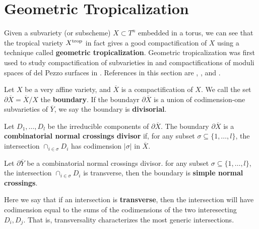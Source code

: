 \section{Geometric Tropicalization}
\label{sec:geometric-tropicalization}
    Given a subvariety (or subscheme) $X \subset T^n$ embedded in a torus,
    we can see that the tropical variety $X^{\operatorname{trop}}$ in fact gives a good compactification of $X$
    using a technique called \textbf{geometric tropicalization}.
    Geometric tropicalization was first used to study compactification of subvarieties in \citet{Tevelev2007} and compactifications of moduli spaces of del Pezzo surfaces in \citet{Hacking2007}. References in this section are 
    \citet{Maclagan2015}, \citet{Payne2014},
    \citet{Cavalieri2014}
    and 
    \citet{Cueto2011}.
    
    \begin{definition}
    \label{def:boundary-divisorial}
        Let $X$ be a very affine variety,
        and $\overline{X}$ is a compactification of $X$.
        We call the set $\partial \overline{X} = \overline{X}/X$
        the \textbf{boundary}.
        If the boundayr $\partial \overline{X}$ is a union of codimension-one subvarieties of $\overline{Y}$, 
        we say the boundary is \textbf{divisorial}.
    \end{definition}
    
    \begin{definition}
    \label{def:combinatorial-normal-crossings-divisor}
        Let $D_1, \ldots, D_l$
        be the irreducible components of $\partial \overline{X}$.
        The boundary $\partial \overline{X}$ is a \textbf{combinatorial normal crossings divisor}
        if, 
        for any subset $\sigma \subseteq \{1, \ldots, l\}$,
        the intersection $\cap_{i \in \sigma} D_i$ has codimension $|\sigma|$ in $\overline{X}$.
    \end{definition}
    
    \begin{definition}
    \label{def:simple-normal-crossings}
        Let $\partial \overline{Y}$ be a combinatorial normal crossings divisor.
        for any subset $\sigma \subseteq \{1, \ldots, l\}$,
        the intersection $\cap_{i \in \sigma} D_i$ is transverse,
        then the boundary is \textbf{simple normal crossings}.
    \end{definition}
    Here we say that if an intersection is \textbf{transverse}, then the intersection will have codimension equal to the sums of the codimensions of the two interesecting $D_i, D_j$.
    That is, transversality characterizes the most generic intersections.

